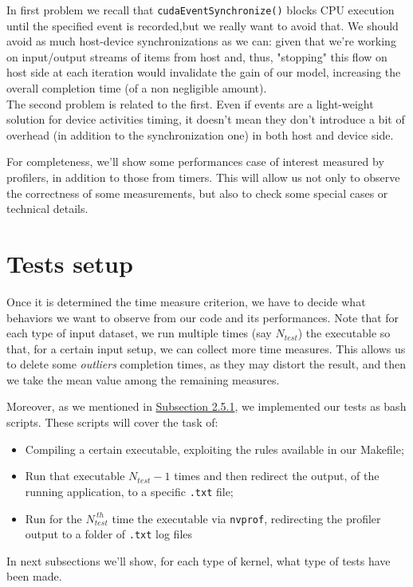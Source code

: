 In first problem we recall that \texttt{cudaEventSynchronize()} blocks CPU execution until the specified event is recorded,but we really want to avoid that.
We should avoid as much host-device synchronizations as we can: given that we're working on input/output streams of items from host and, thus, "stopping" this flow on host side at each iteration would invalidate the gain of our model, increasing the overall completion time (of a non negligible amount).\\
The second problem is related to the first. Even if events are a light-weight solution for device activities timing, it doesn't mean they don't introduce a bit of overhead (in addition to the synchronization one) in both host and device side.

For completeness, we'll show some performances case of interest measured by profilers, in addition to those from timers.
This will allow us not only to observe the correctness of some measurements, but also to check some special cases or technical details.


\section{Tests setup}
Once it is determined the time measure criterion, we have to decide what behaviors we want to observe from our code and its performances.
Note that for each type of input dataset, we run multiple times (say \(N_{test}\)) the executable so that, for a certain input setup, we can collect more time measures. This allows us to delete some \textit{outliers} completion times, as they may distort the result, and then we take the mean value among the remaining measures.

Moreover, as we mentioned in \hyperref[subs:bash]{Subsection 2.5.1}, we implemented our tests as bash scripts.
These scripts will cover the task of:
\begin{itemize}
	\item Compiling a certain executable, exploiting the rules available in our Makefile;
	\item Run that executable \(N_{test} - 1\) times and then redirect the output, of the running application, to a specific \texttt{.txt} file;
	\item Run for the \(N_{test}^{\ th}\) time the executable via \texttt{nvprof}, redirecting the profiler output to a folder of \texttt{.txt} log files
\end{itemize} 
In next subsections we'll show, for each type of kernel, what type of tests have been made.


